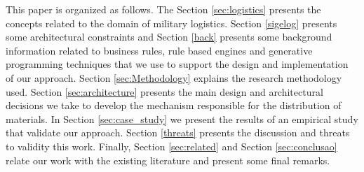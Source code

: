 
This paper is organized as follows. The Section \ref{sec:logistics} presents the concepts related to the domain of military logistics. Section \ref{sigelog} presents some architectural constraints and Section \ref{back} presents some background information related to business rules, rule based engines and generative programming techniques that we use to support the design and implementation of our approach. Section \ref{sec:Methodology} explains the research methodology used. Section \ref{sec:architecture} presents the main design and architectural decisions we take to develop the mechanism responsible for the distribution of materials. In Section \ref{sec:case_study} we present the results of an empirical study that validate our approach. Section \ref{threats} presents the discussion and threats to validity this work. Finally, Section \ref{sec:related} and Section \ref{sec:conclusao} relate our work with the existing literature and present some final remarks.
